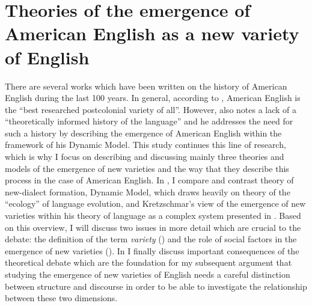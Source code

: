 \section{Theories of the emergence of American English as a new variety of English}
\label{bkm:Ref522870687}\hypertarget{Toc63021205}{}
There are several works which have been written on the history of American English during the last 100 years. In general, according to \citet[250]{Schneider2007}, American English is the “best researched postcolonial variety of all”. However, \citet[250]{Schneider2007} also notes a lack of a “theoretically informed history of the language” and he addresses the need for such a history by describing the emergence of American English within the framework of his Dynamic Model. This study continues this line of research, which is why I focus on describing and discussing mainly three theories and models of the emergence of new varieties and the way that they describe this process in the case of American English. In , I compare and contrast  theory of new-dialect formation,  Dynamic Model, which draws heavily on  theory of the “ecology” of language evolution, and Kretzschmar’s view of the emergence of new varieties within his theory of language as a complex system presented in \citet{Kretzschmar2014, Kretzschmar2015, Kretzschmar2015b}. Based on this overview, I will discuss two issues in more detail which are crucial to the debate: the definition of the term \textit{variety} () and the role of social factors in the emergence of new varieties (). In  I finally discuss important consequences of the theoretical debate which are the foundation for my subsequent argument that studying the emergence of new varieties of English needs a careful distinction between structure and discourse in order to be able to investigate the relationship between these two dimensions.


